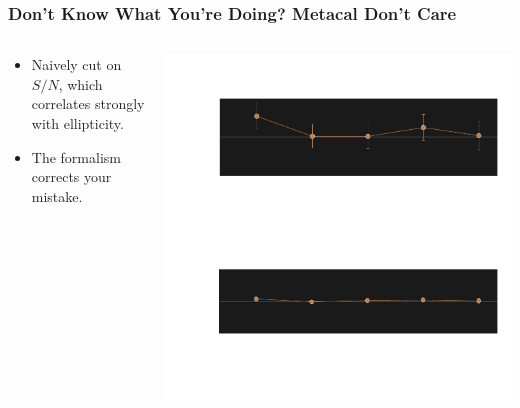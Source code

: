 \documentclass{beamer}
\newcommand{\snr}{$S/N$}
\begin{document}
\frame
{
    \frametitle{Don't Know What You're Doing?  Metacal Don't Care}
 
 
    \begin{columns}
        \begin{column}{0.4\textwidth}
            \begin{itemize}
                \item Naively cut on {\color{lightsteelblue} \snr}, which correlates
                    strongly with ellipticity.
                \item The formalism corrects your mistake.
            \end{itemize}
        \end{column}
        \begin{column}{0.6\textwidth}
            \begin{center}
            \includegraphics[width=\textwidth]{mc-select-bias-thresh-inv.pdf}
                \newline
            \end{center}
        \end{column}
    \end{columns}


}
\end{document}
